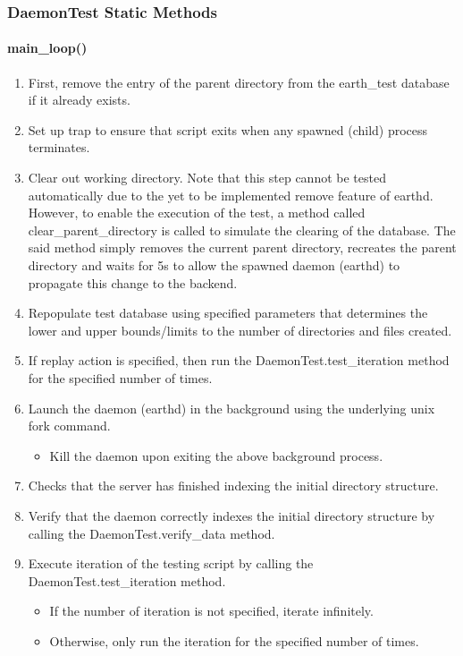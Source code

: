 \documentclass[oneside, 10pt, a4]{article}
\begin{document}
\subsubsection*{DaemonTest Static Methods}

\paragraph{\textbf{\normalsize{main\_loop()}}}
\begin{enumerate}
\item First, remove the entry of the parent directory from the earth\_test database if it already exists.
\item Set up trap to ensure that script exits when any spawned (child) process terminates.
\item Clear out working directory. Note that this step cannot be tested automatically due to the yet to be implemented remove feature of earthd. However, to enable the execution of the test, a method called clear\_parent\_directory is called to simulate the clearing of the database. The said method simply removes the current parent directory, recreates the parent directory and waits for 5s to allow the spawned daemon (earthd) to propagate this change to the backend.
\item Repopulate test database using specified parameters that determines the lower and upper bounds/limits to the number of directories and files created.
\item If replay action is specified, then run the DaemonTest.test\_iteration method for the specified number of times.
\item Launch the daemon (earthd) in the background using the underlying unix fork command. 
  \begin{itemize}
  \item Kill the daemon upon exiting the above background process.
  \end{itemize}  
\item Checks that the server has finished indexing the initial directory structure. 
\item Verify that the daemon correctly indexes the initial directory structure by calling the DaemonTest.verify\_data method.
\item Execute iteration of the testing script by calling the DaemonTest.test\_iteration method.
  \begin{itemize}
  \item If the number of iteration is not specified, iterate infinitely. 
  \item Otherwise, only run the iteration for the specified number of times.
  \end{itemize}
\end{enumerate}
\end{document}
